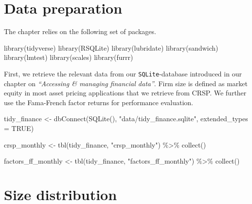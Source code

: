 \documentclass[
]{krantz}
\newenvironment{Shaded}{\begin{snugshade}}{\end{snugshade}}
\newcommand{\AttributeTok}[1]{\textcolor[rgb]{0.61,0.61,0.61}{#1}}
\newcommand{\ConstantTok}[1]{\textcolor[rgb]{0,0,0}{#1}}
\newcommand{\FunctionTok}[1]{\textcolor[rgb]{0,0,0}{#1}}
\newcommand{\NormalTok}[1]{#1}
\newcommand{\OtherTok}[1]{\textcolor[rgb]{0.37,0.37,0.37}{#1}}
\newcommand{\SpecialCharTok}[1]{\textcolor[rgb]{0,0,0}{#1}}
\newcommand{\StringTok}[1]{\textcolor[rgb]{0.5,0.5,0.5}{#1}}
\begin{document}
\hypertarget{data-preparation-1}{%
\section{Data preparation}\label{data-preparation-1}}

The chapter relies on the following set of packages.

\begin{Shaded}
\begin{Highlighting}[]
\FunctionTok{library}\NormalTok{(tidyverse)}
\FunctionTok{library}\NormalTok{(RSQLite)}
\FunctionTok{library}\NormalTok{(lubridate)}
\FunctionTok{library}\NormalTok{(sandwich)}
\FunctionTok{library}\NormalTok{(lmtest)}
\FunctionTok{library}\NormalTok{(scales)}
\FunctionTok{library}\NormalTok{(furrr)}
\end{Highlighting}
\end{Shaded}

First, we retrieve the relevant data from our \texttt{SQLite}-database introduced in our chapter on \emph{``Accessing \& managing financial data''}. Firm size is defined as market equity in most asset pricing applications that we retrieve from CRSP. We further use the Fama-French factor returns for performance evaluation.

\begin{Shaded}
\begin{Highlighting}[]
\NormalTok{tidy\_finance }\OtherTok{\textless{}{-}} \FunctionTok{dbConnect}\NormalTok{(}\FunctionTok{SQLite}\NormalTok{(), }\StringTok{"data/tidy\_finance.sqlite"}\NormalTok{, }\AttributeTok{extended\_types =} \ConstantTok{TRUE}\NormalTok{)}

\NormalTok{crsp\_monthly }\OtherTok{\textless{}{-}} \FunctionTok{tbl}\NormalTok{(tidy\_finance, }\StringTok{"crsp\_monthly"}\NormalTok{) }\SpecialCharTok{\%\textgreater{}\%}
  \FunctionTok{collect}\NormalTok{()}

\NormalTok{factors\_ff\_monthly }\OtherTok{\textless{}{-}} \FunctionTok{tbl}\NormalTok{(tidy\_finance, }\StringTok{"factors\_ff\_monthly"}\NormalTok{) }\SpecialCharTok{\%\textgreater{}\%}
  \FunctionTok{collect}\NormalTok{()}
\end{Highlighting}
\end{Shaded}

\hypertarget{size-distribution}{%
\section{Size distribution}\label{size-distribution}}
\end{document}
